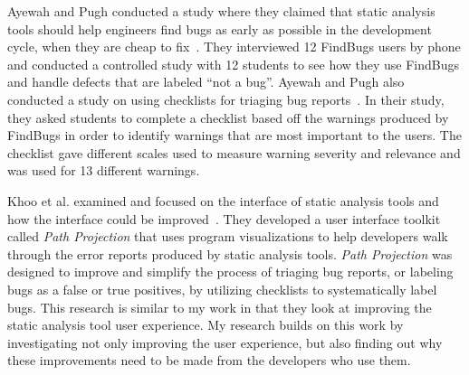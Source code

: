 Ayewah and Pugh conducted a study where they claimed that static analysis tools
should help engineers find bugs as early as possible in the development cycle,
when they are cheap to fix~\cite{Ayewah:2008:FBSurvey}. They interviewed 12
FindBugs users by phone and conducted a controlled study with 12 students to see
how they use FindBugs and handle defects that are labeled ``not a bug''. 
Ayewah and Pugh also conducted a study on using checklists for triaging bug
reports~\cite{Ayewah:2009:Checklists}. In their study, they asked students to
complete a checklist based off the warnings produced by FindBugs in order to
identify warnings that are most important to the users. The checklist gave
different scales used to measure warning severity and relevance and was used
for 13 different warnings.

Khoo et al. examined and focused on the interface of static analysis tools and
how the interface could be improved~\cite{Khoo:2008:PathProjection}. They
developed a user interface toolkit called \emph{Path Projection} that uses
program visualizations to help developers walk through the error reports
produced by static analysis tools.
\emph{Path Projection} was designed to improve and simplify the process of
triaging bug reports, or labeling bugs as a false or true positives, by
utilizing checklists to systematically label bugs. This research is similar to my
work in that they look at improving the static analysis tool user experience.
My research builds on this work by investigating not only improving the user
experience, but also finding out why these improvements need to be made from the
developers who use them.


